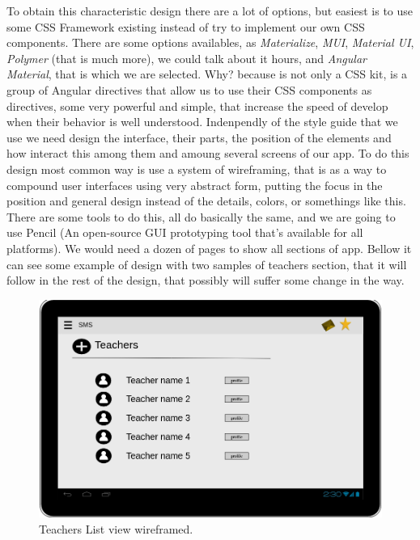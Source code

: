 \noindent To obtain this characteristic design there are a lot of options, but easiest
is to use some CSS Framework existing instead of try to implement our own
CSS components. There are some options availables, as \textit{Materialize},
\textit{MUI}, \textit{Material UI}, \textit{Polymer} (that is much more),
we could talk about it hours, and \textit{Angular Material}, that is which
we are selected.
Why? because is not only a CSS kit, is a group of Angular directives that allow
us to use their CSS components as directives, some very powerful and simple,
that increase the speed of develop when their behavior is well understood.
\intro
Indenpendly of the style guide that we use we need design the interface,
their parts, the position of the elements and how interact this among them and
amoung several screens of our app.
To do this design most common way is use a system of wireframing, that is
as a way to compound user interfaces using very abstract form, putting the
focus in the position and general design instead of the details, colors, or
somethings like this.
There are some tools to do this, all do basically the same, and we
are going to use Pencil (An open-source GUI prototyping tool that's available
for all platforms).
\intro
We would need a dozen of pages to show all sections of app. Bellow it can see
some example of design with two samples of teachers section,
that it will follow in the rest of the design, that possibly will suffer some
change in the way.

\begin{figure}[H]
  \includegraphics[scale=0.2]{img/snaps/teachers_list_wireframe.png}
  \centering
  \caption{Teachers List view wireframed.}
\end{figure}

